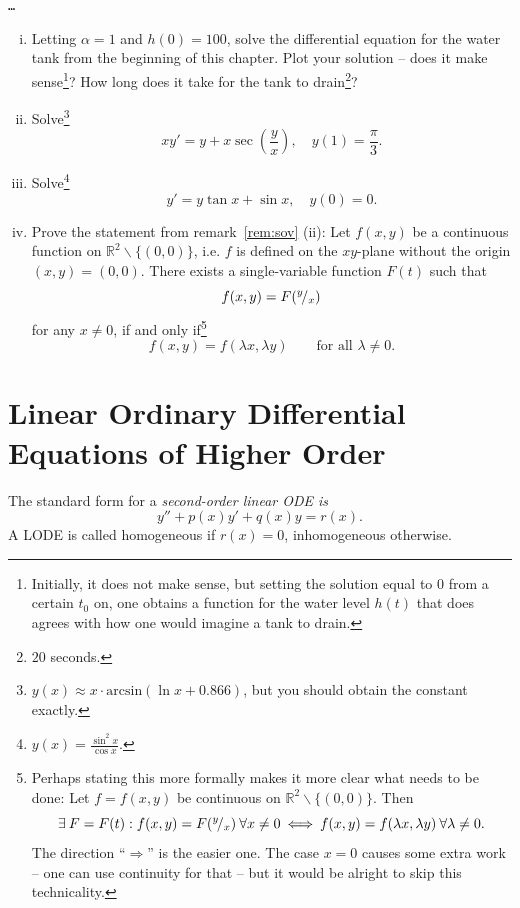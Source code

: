 \begin{application}
\texttt{\ldots}
\end{application}

\begin{exercise}
\begin{enumerate}[(i)]
	\item Letting $\alpha=1$ and $h(0)=100$, solve the differential equation for the water tank from the beginning of this chapter. Plot your solution -- does it make sense\footnote{Initially, it does not make sense, but setting the solution equal to $0$ from a certain $t_0$ on, one obtains a function for the water level $h(t)$ that does agrees with how one would imagine a tank to drain.}? How long does it take for the tank to drain\footnote{$20$ seconds.}?
	\item Solve\footnote{$y(x) \approx x \cdot \text{arcsin} ( \ln x + 0.866 )$,
	but you should obtain the constant exactly.}
	\[ xy'=y+x\sec\left(\frac{y}{x}\right), \quad y(1)=\frac{\pi}{3}.\]
	\item Solve\footnote{$y(x)=\frac{\sin^2x}{\cos x}$.}
	\[ y' = y \tan x + \sin x, \quad y(0)=0. \]
	\item Prove the statement from remark~\ref{rem:sov} (ii): Let $f(x,y)$ be a continuous function on $\mathbb{R}^2\backslash\{(0,0)\}$, i.e. $f$ is defined on the $xy$-plane without the origin $(x,y)=(0,0)$. There exists a single-variable function $F(t)$ such that 
	\[ f(x,y)=F({}^{y}\!/_{x}) \]
	for any $x\not=0$, if and only if\footnote{Perhaps stating this more formally makes it more clear what needs to be done: Let $f=f(x,y)$ be continuous on $\mathbb{R}^2\backslash\{(0,0)\}$. Then
	\[ \exists \: F=F(t): f(x,y)=F({}^{y}\!/_{x}) \: \forall x\not=0
	\: \Longleftrightarrow \: f(x,y)=f(\lambda x, \lambda y) \: \forall \lambda\not=0.
	\] The direction ``$\Longrightarrow$'' is the easier one. The case $x=0$ causes some extra work -- one can use continuity for that -- but it would be alright to skip this technicality.}
	\[ f(x,y) = f(\lambda x, \lambda y) \qquad \text{for all~}\lambda\not=0.\]
\end{enumerate}
\end{exercise}


\section{Linear Ordinary Differential Equations of Higher Order}
\label{sec:s-o}

\begin{definition}
	The standard form for a \emph{second-order linear ODE is}
	\[ y''+p(x)y'+q(x)y=r(x). \]
	A LODE is called homogeneous if $r(x)=0$, inhomogeneous otherwise.
\end{definition}

